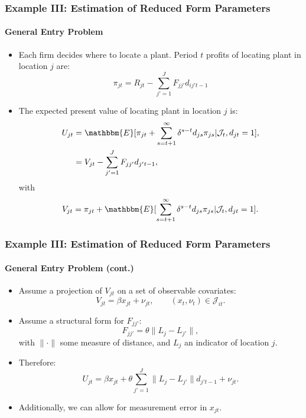 \begin{frame}
\frametitle{Example III: Estimation of Reduced Form Parameters}
\framesubtitle{General Entry Problem}

\begin{itemize}
	\item Each firm decides where to locate a plant. Period $t$ profits of locating plant in location $j$ are:
	\begin{equation*}
	\pi_{jt} = R_{jt}-\sum_{j'=1}^{J}F_{jj'}d_{ij't-1}
	\end{equation*}
	\item The expected present value of locating plant in location $j$ is:
	\begin{align*}
	U_{jt}&=\mathbbm{E}[\pi_{jt}+\sum_{s=t+1}^{\infty}\delta^{s-t}d_{js}\pi_{js}|\mathcal{J}_{t},d_{jt}=1],\\
	&=V_{jt}-\sum_{j'=1}^{J}F_{jj'}d_{j't-1},
	\end{align*}
	with
	\begin{equation*}
	V_{jt}=\pi_{jt}+\mathbbm{E}[\sum_{s=t+1}^{\infty}\delta^{s-t}d_{js}\pi_{js}|\mathcal{J}_{t},d_{jt}=1].
	\end{equation*}
\end{itemize}
\end{frame}
\begin{frame}
\frametitle{Example III: Estimation of Reduced Form Parameters}
\framesubtitle{General Entry Problem (cont.)}

\begin{itemize}
	\item Assume a projection of $V_{jt}$ on a set of observable covariates:
	\begin{equation*}
	V_{jt}=\beta x_{jt} + \nu_{jt},\qquad(x_{t},\nu_{t})\in\mathcal{J}_{it}.
	\end{equation*}
	\item Assume a structural form for $F_{jj'}$:
	\begin{equation*}
	F_{jj'}=\theta\|L_{j}-L_{j'}\|,
	\end{equation*}
	with $\|\cdot\|$ some measure of distance, and $L_{j}$ an indicator of location $j$.
	\item Therefore:
	\begin{equation*}
	U_{jt}=\beta x_{jt}+\theta\sum_{j'=1}^{J}\|L_{j}-L_{j'}\|d_{j't-1}+\nu_{jt}.
	\end{equation*}
	\item Additionally, we can allow for measurement error in $x_{jt}$.
\end{itemize}
\end{frame}
